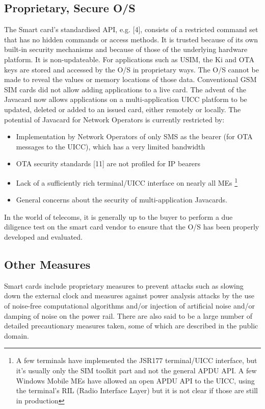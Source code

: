 \documentclass[12pt]{article}
\begin{document}
\subsection{Proprietary, Secure O/S}
The Smart card’s standardised API, e.g. [4], consists of a restricted command set that has no hidden commands or access methods. It is trusted because of its own built-in security mechanisms and because of those of the underlying hardware platform. It is non-updateable. \newline For applications such as USIM, the Ki and OTA keys are stored and accessed by the O/S in proprietary ways. The O/S cannot be made to reveal the values or memory locations of those data. Conventional GSM SIM cards did not allow adding applications to a live card. The advent of the Javacard now allows applications on a multi-application UICC platform to be updated, deleted or added to an issued card, either remotely or locally. The potential of Javacard for Network Operators is currently restricted by:
\begin{itemize}
\item Implementation by Network Operators of only SMS as the bearer (for OTA messages to the UICC), which has a very limited bandwidth 
\item OTA security standards [11] are not profiled for IP bearers 
\item Lack of a sufficiently rich terminal/UICC interface on nearly all MEs \footnote{A few terminals have implemented the JSR177  terminal/UICC interface, but it’s usually only the SIM toolkit part and not the general APDU API. A few Windows Mobile MEs have allowed an open APDU API to the UICC, using the terminal’s RIL (Radio Interface Layer) but it is not clear if those are still in production}
\item General concerns about the security of multi-application Javacards.
\end{itemize}
In the world of telecoms, it is generally up to the buyer to perform a due diligence test on the smart card vendor to ensure that the O/S has been properly developed and evaluated.

\subsection{Other Measures}
Smart cards include proprietary measures to prevent attacks such as slowing down the external clock and measures against power analysis attacks by the use of noise-free computational algorithms and/or injection of artificial noise and/or damping of noise on the power rail. There are also said to be a large number of detailed precautionary measures taken, some of which are described in the public domain.
\end{document}
